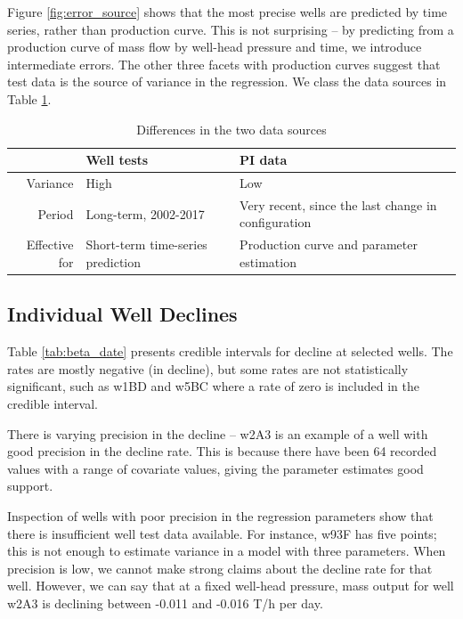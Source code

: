 \documentclass[a4paper, 12pt]{article}
\begin{document}
Figure \ref{fig:error_source} shows that the most precise wells are predicted by time series, rather than production curve. This is not surprising -- by predicting from a production curve of mass flow by well-head pressure and time, we introduce intermediate errors. The other three facets with production curves suggest that test data is the source of variance in the regression. We class the data sources in Table \ref{tab:data_sources}.

\begin{table}
\centering
\begin{tabularx}{0.85\linewidth}{rXX}
\hline
 & Well tests & PI data \\ 
  \hline
Variance & High & Low  \\
Period & Long-term, 2002-2017 & Very recent, since the last change in configuration \\
Effective for & Short-term time-series prediction & Production curve and parameter estimation \\
   \hline
\end{tabularx}
\caption{Differences in the two data sources}
\label{tab:data_sources}
\end{table}

\subsection{Individual Well Declines}



Table \ref{tab:beta_date} presents credible intervals for decline at selected wells. The rates are mostly negative (in decline), but some rates are not statistically significant, such as w1BD and w5BC where a rate of zero is included in the credible interval.

There is varying precision in the decline -- w2A3 is an example of a well with good precision in the decline rate. This is because there have been 64 recorded values with a range of covariate values, giving the parameter estimates good support.

Inspection of wells with poor precision in the regression parameters show that there is insufficient well test data available. For instance, w93F %
has five points; this is not enough to estimate variance in a model with three parameters. When precision is low, we cannot make strong claims about the decline rate for that well. However, we can say that at a fixed well-head pressure, mass output for well w2A3 %
is declining between -0.011 and -0.016 T/h per day.
\end{document}
